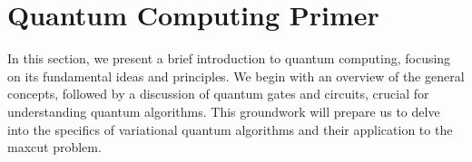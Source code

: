 


\section{Quantum Computing Primer}
\label{section:QC_Primer}

In this section, we present a brief introduction to quantum computing, focusing on its fundamental ideas and principles. We begin with an overview of the general concepts, followed by a discussion of quantum gates and circuits, crucial for understanding quantum algorithms. This groundwork will prepare us to delve into the specifics of variational quantum algorithms and their application to the \acrshort{maxcut} problem.





